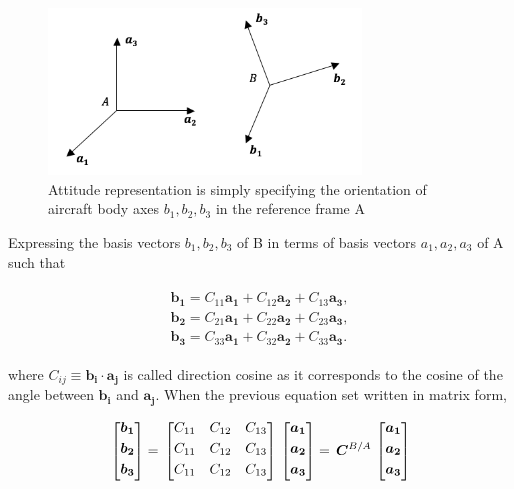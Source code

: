 \begin{figure}
\begin{center}
\includegraphics[width=8.3cm]{figures/theTwoFrames}    %
\caption{Attitude representation is simply specifying the orientation of 
aircraft body axes $b_1, b_2, b_3$ in the reference frame A} 
\label{fig:theTwoFrames}
\end{center}
\end{figure}

Expressing the basis vectors $b_1, b_2, b_3$ of B in terms of basis 
vectors $a_1, a_2, a_3$ of A such that

\begin{align}
\label{eqn:C_B_A}
\begin{split}
\bm{b_1} = C_{11}\bm{a_1} + C_{12}\bm{a_2} + C_{13}\bm{a_3}  ,
\\
\bm{b_2} = C_{21}\bm{a_1} + C_{22}\bm{a_2} + C_{23}\bm{a_3}  ,
\\
\bm{b_3} = C_{33}\bm{a_1} + C_{32}\bm{a_2} + C_{33}\bm{a_3}  .
\end{split}
\end{align}

where $C_{ij} \equiv {\bm{b_i} \cdot \bm{a_j}} $  is called direction cosine as 
it corresponds to the cosine of the angle between  $\bm{b_i}$ and $\bm{a_j}$. 
When the previous equation set written in matrix form,

\begin{equation}{\label{eqn:C_B_Amatrix}}
\begin{bmatrix}
\bm{b_1}\\[0.3em]
\bm{b_2}\\[0.3em]
\bm{b_3}\\[0.3em]
\end{bmatrix}
=\,
\begin{bmatrix}
C_{11} & C_{12} & C_{13}\\[0.3em]
C_{11} & C_{12} & C_{13}\\[0.3em]
C_{11} & C_{12} & C_{13}\\[0.3em]
\end{bmatrix}
\,
\begin{bmatrix}
\bm{a_1}\\[0.3em]
\bm{a_2}\\[0.3em]
\bm{a_3}\\[0.3em]
\end{bmatrix}
=\,
\bm{C}^{B/A}
\,
\begin{bmatrix}
\bm{a_1}\\[0.3em]
\bm{a_2}\\[0.3em]
\bm{a_3}\\[0.3em]
\end{bmatrix}
\end{equation} 


